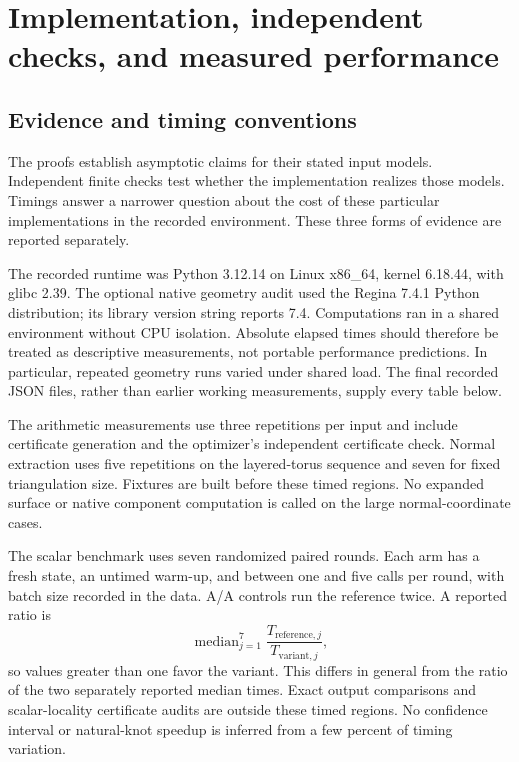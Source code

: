 \section{Implementation, independent checks, and measured performance}
\label{sec:experiments}

\subsection{Evidence and timing conventions}

The proofs establish asymptotic claims for their stated input models.
Independent finite checks test whether the implementation realizes those
models. Timings answer a narrower question about the cost of these particular
implementations in the recorded environment. These three forms of evidence
are reported separately.

The recorded runtime was Python 3.12.14 on Linux x86\_64, kernel 6.18.44,
with glibc 2.39. The optional native geometry audit used the Regina 7.4.1
Python distribution; its library version string reports 7.4. Computations
ran in a shared environment without CPU isolation. Absolute elapsed times
should therefore be treated as descriptive measurements, not portable
performance predictions. In particular, repeated geometry runs varied under
shared load. The final recorded JSON files, rather than earlier working
measurements, supply every table below.

The arithmetic measurements use three repetitions per input and include
certificate generation and the optimizer's independent certificate check.
Normal extraction uses five repetitions on the layered-torus sequence and
seven for fixed triangulation size. Fixtures are built before these timed
regions. No expanded surface or native component computation is called on
the large normal-coordinate cases.

The scalar benchmark uses seven randomized paired rounds. Each arm has a
fresh state, an untimed warm-up, and between one and five calls per round,
with batch size recorded in the data. A/A controls run the reference twice.
A reported ratio is
\[
 \operatorname{median}_{j=1}^7\frac{T_{\mathrm{reference},j}}
                                      {T_{\mathrm{variant},j}},
\]
so values greater than one favor the variant. This differs in general from
the ratio of the two separately reported median times. Exact output
comparisons and scalar-locality certificate audits are outside these timed
regions. No confidence interval or natural-knot speedup is inferred from a
few percent of timing variation.

